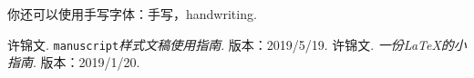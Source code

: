 \documentclass[9pt,oneside,mpar,cn,nclassical]{manuscript}
\begin{document}
    你还可以使用手写字体：{\handwriting 手写}，{\enhandwriting\normalsize handwriting}. 
    
    \vspace{-0.5\baselineskip}
    \begin{thebibliography}{}
         许锦文. \texttt{manuscript}\textit{样式文稿使用指南}. 版本：2019/5/19.
         许锦文. \textit{一份\emph{\LaTeX}的小指南}. 版本：2019/1/20.
    \end{thebibliography}
\end{document}
